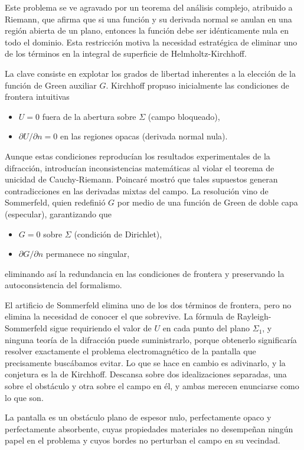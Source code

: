 		Este problema se ve agravado por un teorema del análisis complejo, atribuido a Riemann, que afirma que si una función y su derivada normal se anulan en una región abierta de un plano, entonces la función debe ser idénticamente nula en todo el dominio. Esta restricción motiva la necesidad estratégica de eliminar uno de los términos en la integral de superficie de Helmholtz-Kirchhoff.

		La clave consiste en explotar los grados de libertad inherentes a la elección de la función de Green auxiliar $G$. Kirchhoff propuso inicialmente las condiciones de frontera intuitivas
		\begin{itemize}
			\item $U = 0$ fuera de la abertura sobre $\Sigma$ (campo bloqueado),
			\item $\partial U/\partial n = 0$ en las regiones opacas (derivada normal nula).
		\end{itemize}

		Aunque estas condiciones reproducían los resultados experimentales de la difracción, introducían inconsistencias matemáticas al violar el teorema de unicidad de Cauchy-Riemann. Poincaré mostró que tales supuestos generan contradicciones en las derivadas mixtas del campo. La resolución vino de Sommerfeld, quien redefinió $G$ por medio de una función de Green de doble capa (especular), garantizando que
		\begin{itemize}
			\item $G = 0$ sobre $\Sigma$ (condición de Dirichlet),
			\item $\partial G/\partial n$ permanece no singular,
		\end{itemize}

	eliminando así la redundancia en las condiciones de frontera y preservando la autoconsistencia del formalismo.

	El artificio de Sommerfeld elimina uno de los dos términos de frontera, pero no elimina la necesidad de conocer el que sobrevive. La fórmula de Rayleigh-Sommerfeld sigue requiriendo el valor de $U$ en cada punto del plano $\Sigma_{1}$, y ninguna teoría de la difracción puede suministrarlo, porque obtenerlo significaría resolver exactamente el problema electromagnético de la pantalla que precisamente buscábamos evitar. Lo que se hace en cambio es adivinarlo, y la conjetura es la de Kirchhoff. Descansa sobre dos idealizaciones separadas, una sobre el obstáculo y otra sobre el campo en él, y ambas merecen enunciarse como lo que son.

	\begin{Assumption}
		La pantalla es un obstáculo plano de espesor nulo, perfectamente opaco y perfectamente absorbente, cuyas propiedades materiales no desempeñan ningún papel en el problema y cuyos bordes no perturban el campo en su vecindad.
	\end{Assumption}

